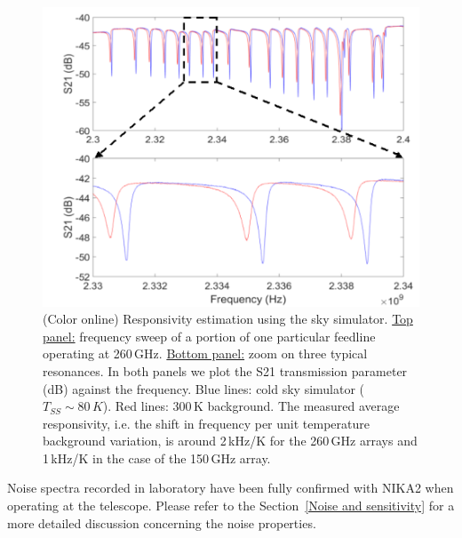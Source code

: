 \documentclass[]{aa} %
\begin{document}
\begin{figure}[h]
\begin{center}
   \centering
    \includegraphics[width=1.0\linewidth]{260GHz-H_sky.png}
    \caption{(Color online) Responsivity estimation using the sky simulator. \underline{Top panel:} frequency sweep of a portion of one particular feedline operating at 260\,GHz. \underline{Bottom panel:} zoom on three typical resonances. In both panels we plot the S21 transmission parameter (dB) against the frequency. Blue lines: cold sky simulator ($T_{SS} \sim 80\,K$). Red lines: 300\,K background. The measured average responsivity, i.e. the shift in frequency per unit temperature background variation, is around 2\,kHz/K for the 260\,GHz arrays and 1\,kHz/K in the case of the 150\,GHz array.}
         \label{Shift_f}
\end{center}
\end{figure}

Noise spectra recorded in laboratory have been fully confirmed with NIKA2 when operating at the telescope. Please refer to the Section~\ref{Noise and sensitivity} for a more detailed discussion concerning the noise properties. 
\end{document}
